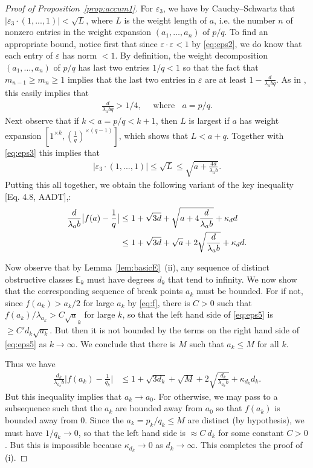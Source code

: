 \documentclass[11pt, reqno]{amsart}
\theoremstyle{remark}
\numberwithin{equation}{subsection}
\numberwithin{figure}{section}
\theoremstyle{customremark}
\newcommand{\bE}{{\mathbb E}}
\newcommand{\ka}{{\kappa}}
\newcommand{\la}{{\lambda}}
\newcommand{\MS}{{\medskip}}
\newcommand{\eps}{\varepsilon}
\begin{document}
\begin{proof}[Proof of Proposition~\ref{prop:accum1}]
For $\eps_3$, we have by Cauchy--Schwartz that  $|\eps_3\cdot(1,...,1)|<\sqrt  L$, where $L$ is the weight length of $a$, i.e. the number $n$ of nonzero entries in    
the weight expansion $(a_1,\dots,a_n)$ of $p/q$.
To find an appropriate bound, notice first that
since $\eps\cdot\eps< 1$ by \eqref{eq:eps2}, we do know that each  entry of $\eps$ has norm $<1$.
By definition, the weight decomposition $(a_1,\dots,a_n)$  of $p/q$ has last two entries $1/q< 1$ so that the fact that  $m_{n-1} \ge m_n \ge 1$ implies that the last two entries in  $\eps$  are at least $1 - \frac d{\la_a bq}$.
As in \cite[(4.5)]{AADT}, this easily implies that 
\begin{align}\label{eq:eps3}
\frac d{\la_a b q} > 1/4, \quad \mbox{ where }\;\; a = p/q.
\end{align}
Next observe that if $k< a=p/q  < k+1$, then $L$ is largest if $a$ has weight expansion $[1^{\times k}, (\frac 1q)^{\times (q-1)}]$, which shows that  $L< a + q$. Together with \eqref{eq:eps3} this implies that  
\begin{align}\label{eq:eps4}
|\eps_3\cdot(1,...,1)| \le \sqrt{L} \le\sqrt{ a + \frac {4d} {\la_a b}}.
\end{align}
Putting this all together, we obtain the following variant of the key inequality [Eq. 4.8, AADT],:
\begin{align}\label{eq:eps5}
\frac{d}{\la_ab}\bigl|f(a) -\frac 1q\bigr|& \le 1 + \sqrt{3d} + \sqrt{a + 4\frac{d}{\la_ab}} + \ka_d d \\ \notag
&\le  1 + \sqrt{3d} + \sqrt{a} + 2\sqrt{\frac{d}{\la_a b}} + \ka_d d.
\end{align}

Now observe that by Lemma~\ref{lem:basicE}~(ii), any sequence of distinct  obstructive classes $\bE_k$ must have degrees $d_k$ that tend to infinity.
We now show that 
the corresponding sequence of 
break points $a_k$ must be bounded.   For if not, since $f(a_k)> a_k/2$ for large $a_k$ by \eqref{eq:f},  there is $C>0$ such that
 $f(a_k)/\la_{a_k} >  C \sqrt a_k$ for large $k$, so that the left hand side of \eqref{eq:eps5} is $\ge C' d_k \sqrt{a_k}$. But then it is not bounded by the terms on the right hand side of   
 \eqref{eq:eps5} as $k\to \infty$.
We conclude that 
 there is $M$ such that
 $a_k\le M$ for all $k$.

 
 Thus we have
 \begin{align*}%
\frac{d_k}{\la_{a_k}b}\bigl|f(a_k) -\frac 1{q_k}\bigr|
&\le  1 + \sqrt{3d_k} + \sqrt{M} + 2\sqrt{\frac{d_k}{\la_{a_k} b}} + \ka_{d_k} d_k.
\end{align*}
But this inequality implies that $a_k\to a_0$.  For otherwise, we may pass to a subsequence such that the  $a_k$ are bounded away from $a_0$ so that $f(a_k)$ is bounded away from $0$.  Since the $a_k = p_k/q_k \le M$ are distinct (by hypothesis),  we must have $1/q_k \to 0$, so that the left hand side is $\approx C\ d_k$ for some constant $C>0$.
But this is impossible 
because $\ka_{d_k}\to 0 $ as $d_k\to \infty$.
This completes the proof of (i).
\MS


\end{proof}
\end{document}

